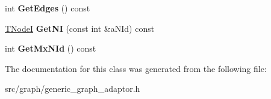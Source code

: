 \begin{DoxyCompactItemize}
\item 
\hypertarget{classall__distance__sketch_1_1graph_1_1GenericGraphAdaptor_a48585126560786dace8e822980ef5add}{}int {\bfseries Get\+Edges} () const \label{classall__distance__sketch_1_1graph_1_1GenericGraphAdaptor_a48585126560786dace8e822980ef5add}

\item 
\hypertarget{classall__distance__sketch_1_1graph_1_1GenericGraphAdaptor_a07533a46b429882b4445ebc38ec32847}{}\hyperlink{classall__distance__sketch_1_1graph_1_1GenericGraphAdaptor_1_1GenericIterator}{T\+Node\+I} {\bfseries Get\+N\+I} (const int \&a\+N\+Id) const \label{classall__distance__sketch_1_1graph_1_1GenericGraphAdaptor_a07533a46b429882b4445ebc38ec32847}

\item 
\hypertarget{classall__distance__sketch_1_1graph_1_1GenericGraphAdaptor_adffc8dfb17cd444bdb334c4718c6f7fd}{}int {\bfseries Get\+Mx\+N\+Id} () const \label{classall__distance__sketch_1_1graph_1_1GenericGraphAdaptor_adffc8dfb17cd444bdb334c4718c6f7fd}

\end{DoxyCompactItemize}


The documentation for this class was generated from the following file\+:\begin{DoxyCompactItemize}
\item 
src/graph/generic\+\_\+graph\+\_\+adaptor.\+h\end{DoxyCompactItemize}
